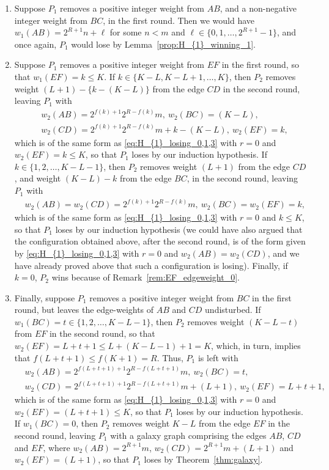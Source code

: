 \documentclass[11pt,reqno]{amsart}
\theoremstyle{definition}
\theoremstyle{definition}
\begin{document}
\begin{enumerate}
\item Suppose $P_{1}$ removes a positive integer weight from $AB$, and a non-negative integer weight from $BC$, in the first round. Then we would have $w_{1}(AB)=2^{R+1}n+\ell$ for some $n < m$ and $\ell \in \{0,1,\ldots,2^{R+1}-1\}$, and once again, $P_{1}$ would lose by Lemma~\ref{prop:H_{1}_winning_1}.

\item Suppose $P_{1}$ removes a positive integer weight from $EF$ in the first round, so that $w_{1}(EF)=k\leqslant K$. If $k\in \{K-L,K-L+1,\ldots,K\}$, then $P_{2}$ removes weight $(L+1)-\{k-(K-L)\}$ from the edge $CD$ in the second round, leaving $P_{1}$ with \begin{align}
{}&w_{2}(AB)=2^{f(k)+1}2^{R-f(k)}m,\ w_{2}(BC)=(K-L),\nonumber\\
{}&w_{2}(CD)=2^{f(k)+1}2^{R-f(k)}m+k-(K-L),\ w_{2}(EF)=k,\nonumber
\end{align}
which is of the same form as \eqref{eq:H_{1}_losing_0,1,3} with $r=0$ and $w_{2}(EF)=k\leqslant K$, so that $P_{1}$ loses by our induction hypothesis. If $k \in \{1,2,\ldots,K-L-1\}$, then $P_{2}$ removes weight $(L+1)$ from the edge $CD$, and weight $(K-L)-k$ from the edge $BC$, in the second round, leaving $P_{1}$ with 
\begin{align}
{}&w_{2}(AB)=w_{2}(CD)=2^{f(k)+1}2^{R-f(k)}m,\ w_{2}(BC)=w_{2}(EF)=k,\nonumber
\end{align}
which is of the same form as \eqref{eq:H_{1}_losing_0,1,3} with $r=0$ and $k\leqslant K$, so that $P_{1}$ loses by our induction hypothesis (we could have also argued that the configuration obtained above, after the second round, is of the form given by \eqref{eq:H_{1}_losing_0,1,3} with $r=0$ and $w_{2}(AB)=w_{2}(CD)$, and we have already proved above that such a configuration is losing). Finally, if $k=0$, $P_{2}$ wins because of Remark~\ref{rem:EF_edgeweight_0}.

\item Finally, suppose $P_{1}$ removes a positive integer weight from $BC$ in the first round, but leaves the edge-weights of $AB$ and $CD$ undisturbed. If $w_{1}(BC)=t\in \{1,2,\ldots,K-L-1\}$, then $P_{2}$ removes weight $(K-L-t)$ from $EF$ in the second round, so that $w_{2}(EF)=L+t+1 \leqslant L+(K-L-1)+1=K$, which, in turn, implies that $f(L+t+1)\leqslant f(K+1)=R$. Thus, $P_{1}$ is left with 
\begin{align}
{}&w_{2}(AB)=2^{f(L+t+1)+1}2^{R-f(L+t+1)}m,\ w_{2}(BC)=t,\nonumber\\
{}&w_{2}(CD)=2^{f(L+t+1)+1}2^{R-f(L+t+1)}m+(L+1),\ w_{2}(EF)=L+t+1,\nonumber
\end{align}
which is of the same form as \eqref{eq:H_{1}_losing_0,1,3} with $r=0$ and $w_{2}(EF)=(L+t+1)\leqslant K$, so that $P_{1}$ loses by our induction hypothesis. If $w_{1}(BC)=0$, then $P_{2}$ removes weight $K-L$ from the edge $EF$ in the second round, leaving $P_{1}$ with a galaxy graph comprising the edges $AB$, $CD$ and $EF$, where $w_{2}(AB)=2^{R+1}m$, $w_{2}(CD)=2^{R+1}m+(L+1)$ and $w_{2}(EF)=(L+1)$, so that $P_{1}$ loses by Theorem~\ref{thm:galaxy}.
\end{enumerate}
\end{document}
